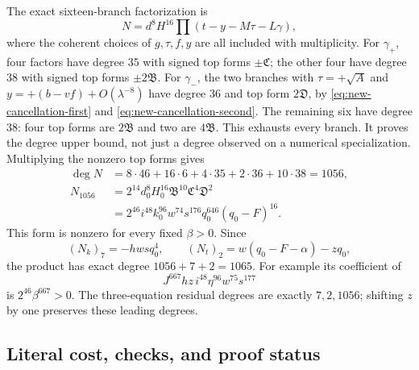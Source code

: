 The exact sixteen-branch factorization is
\begin{equation}
 N=d^8H^{16}\prod(t-y-M\tau-L\gamma),
 \label{eq:new-sixteen-factor}
\end{equation}
where the coherent choices of $g,\tau,f,y$ are all included with
multiplicity.  For $\gamma_+$, four factors have degree $35$ with signed
top forms $\pm\mathfrak C$; the other four have degree $38$ with signed
top forms $\pm2\mathfrak B$.
For $\gamma_-$, the two branches with $\tau=+\sqrt A$ and
$y=+(b-vf)+O(\lambda^{-8})$ have degree $36$ and top form
$2\mathfrak D$, by \eqref{eq:new-cancellation-first} and
\eqref{eq:new-cancellation-second}.
The remaining six have degree $38$: four top forms are $2\mathfrak B$
and two are $4\mathfrak B$.
This exhausts every branch.  It proves the degree upper bound, not just
a degree observed on a numerical specialization.  Multiplying the
nonzero top forms gives
\begin{align*}
 \deg N&=8\cdot46+16\cdot6+4\cdot35+2\cdot36+10\cdot38=1056,\\
 N_{1056}
 &=2^{14}d_0^8H_0^{16}\mathfrak B^{10}\mathfrak C^4\mathfrak D^2\\
 &=2^{46}i^{48}k_0^{96}w^{74}s^{176}q_0^{646}(q_0-F)^{16}.
\end{align*}
This form is nonzero for every fixed $\beta>0$.
Since
\[
 (N_k)_7=-hwsq_0^4,\qquad
 (N_t)_2=w(q_0-F-\alpha)-zq_0,
\]
the product has exact degree $1056+7+2=1065$.
For example its coefficient of
\[
 J^{667}hz\,i^{48}\eta^{96}w^{75}s^{177}
\]
is $2^{46}\beta^{667}>0$.
The three-equation residual degrees are exactly $7,2,1056$; shifting
$z$ by one preserves these leading degrees.

\subsection{Literal cost, checks, and proof status}

